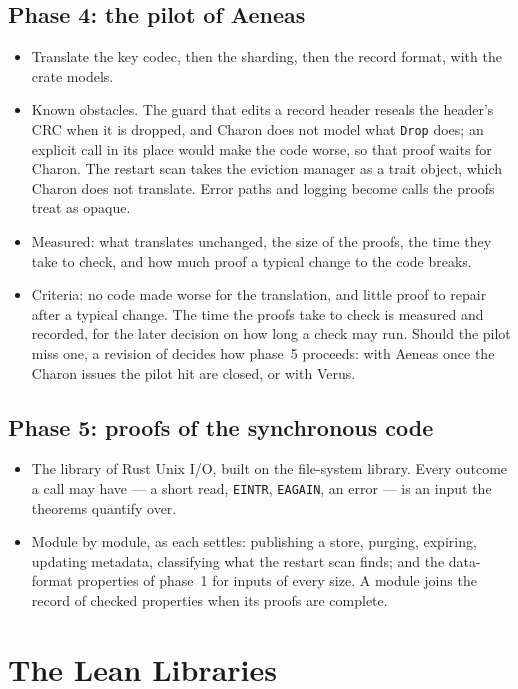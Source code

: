 \subsection*{Phase 4: the pilot of Aeneas}
\begin{itemize}
  \item Translate the key codec, then the sharding, then the record format,
    with the crate models.
  \item Known obstacles. The guard that edits a record header reseals the
    header's CRC when it is dropped, and Charon does not model what
    \texttt{Drop} does; an explicit call in its place would make the code
    worse, so that proof waits for Charon. The restart scan takes the
    eviction manager as a trait object, which Charon does not translate.
    Error paths and logging become calls the proofs treat as opaque.
  \item Measured: what translates unchanged, the size of the proofs, the
    time they take to check, and how much proof a typical change to the code
    breaks.
  \item Criteria: no code made worse for the translation, and little proof to
    repair after a typical change. The time the proofs take to check is
    measured and recorded, for the later decision on how long a check may
    run.
    Should the pilot miss one, a revision of
     decides how phase~5 proceeds: with
    Aeneas once the Charon issues the pilot hit are closed, or with Verus.
\end{itemize}

\subsection*{Phase 5: proofs of the synchronous code}
\begin{itemize}
  \item The library of Rust Unix I/O, built on the file-system library.
    Every outcome a call may have --- a short read, \texttt{EINTR},
    \texttt{EAGAIN}, an error --- is an input the theorems quantify over.
  \item Module by module, as each settles: publishing a store, purging,
    expiring, updating metadata, classifying what the restart scan finds;
    and the data-format properties of phase~1 for inputs of every size. A
    module joins the record of checked properties when its proofs are
    complete.
\end{itemize}

\section{The Lean Libraries}
\label{app:verification-libraries}


